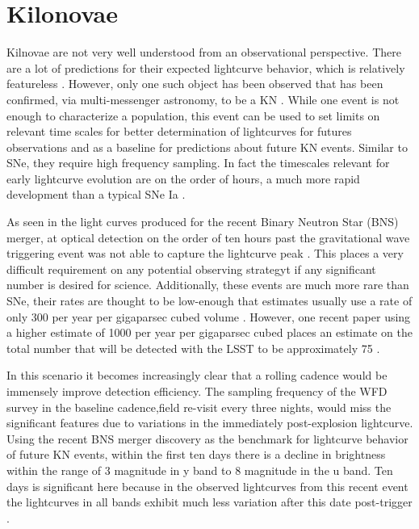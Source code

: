 \documentclass[12pt]{article}
\begin{document}
\section{Kilonovae} %
Kilnovae are not very well understood from an observational perspective. There are a lot of predictions for their expected lightcurve behavior, which is relatively featureless \citep{Rosswog2016a}. However, only one such object has been observed that has been confirmed, via multi-messenger astronomy, to be a KN \citep{Kasliwal2017}. While one event is not enough to characterize a population, this event can be used to set limits on relevant time scales for better determination of lightcurves for futures observations and as a baseline for predictions about future KN events. Similar to SNe, they require high frequency sampling. In fact the timescales relevant for early lightcurve evolution are on the order of hours, a much more rapid development than a typical SNe Ia \citep{Villar2017}. \par
As seen in the light curves produced for the recent Binary Neutron Star (BNS) merger, at optical detection on the order of ten hours past the gravitational wave triggering event was not able to capture the lightcurve peak \citep{Villar2017}. This places a very difficult requirement on any potential observing strategyt if any significant number is desired for science. Additionally, these events are much more rare than SNe, their rates are thought to be low-enough that estimates usually use a rate of only 300 per year per gigaparsec cubed volume \citep{Rosswog2016a}. However, one recent paper using a higher estimate of 1000 per year per gigaparsec cubed places an estimate on the total number that will be detected with the LSST to be approximately 75 \citep{Scolnic2017}.\par
In this scenario it becomes increasingly clear that a rolling cadence would be immensely improve detection efficiency. The sampling frequency of the WFD survey in the baseline cadence,field re-visit every three nights, would miss the significant features due to variations in the immediately post-explosion lightcurve. Using the recent BNS merger discovery as the benchmark for lightcurve behavior of future KN events, within the first ten days there is a decline in brightness within the range of 3 magnitude in y band to 8 magnitude in the u band. Ten days is significant here because in the observed lightcurves from this recent event the lightcurves in all bands exhibit much less variation after this date post-trigger \citep{Villar2017}. \par
\end{document}
